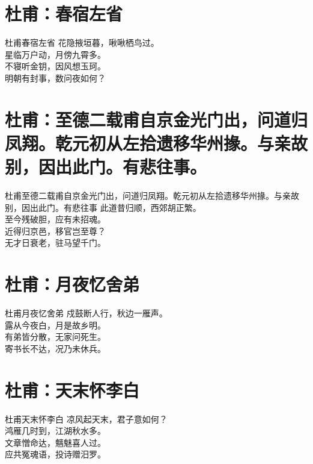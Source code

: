 \documentclass[12pt,oneside,a5paper]{book}
\begin{document}
\chapter{杜甫：春宿左省}
\begin{poemzh}{杜甫}{春宿左省}
花隐掖垣暮，啾啾栖鸟过。\\
星临万户动，月傍九霄多。\\
不寝听金钥，因风想玉珂。\\
明朝有封事，数问夜如何？\\ 
\end{poemzh}

\chapter{杜甫：至德二载甫自京金光门出，问道归凤翔。乾元初从左拾遗移华州掾。与亲故别，因出此门。有悲往事。}

\begin{poemzh}{杜甫}{至德二载甫自京金光门出，问道归凤翔。乾元初从左拾遗移华州掾。与亲故别，因出此门。有悲往事}
此道昔归顺，西郊胡正繁。\\
至今残破胆，应有未招魂。\\
近得归京邑，移官岂至尊？\\
无才日衰老，驻马望千门。\\ 
\end{poemzh}


\chapter{杜甫：月夜忆舍弟}
\begin{poemzh}{杜甫}{月夜忆舍弟}
戍鼓断人行，秋边一雁声。\\
露从今夜白，月是故乡明。\\
有弟皆分散，无家问死生。\\
寄书长不达，况乃未休兵。\\ 
\end{poemzh}

\chapter{杜甫：天末怀李白}
\begin{poemzh}{杜甫}{天末怀李白}
凉风起天末，君子意如何？\\
鸿雁几时到，江湖秋水多。\\
文章憎命达，魑魅喜人过。\\
应共冤魂语，投诗赠汨罗。\\ 
\end{poemzh}
\end{document}
